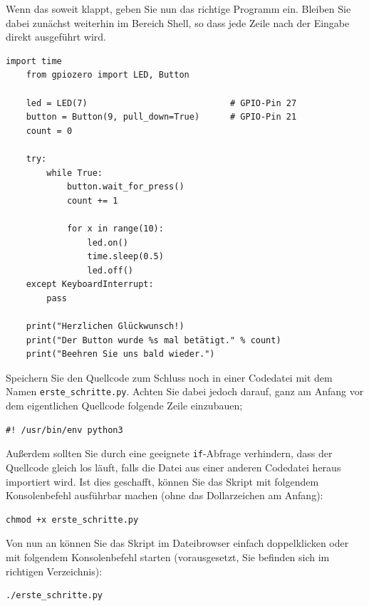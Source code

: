 \bigskip
\teilaufgabe
Wenn das soweit klappt, geben Sie nun das richtige Programm ein. Bleiben Sie
dabei zunächst weiterhin im Bereich \glqq{}Shell\grqq{}, so dass jede Zeile
nach der Eingabe direkt ausgeführt wird.

\begin{Verbatim}[gobble=4]
    import time
    from gpiozero import LED, Button

    led = LED(7)                            # GPIO-Pin 27
    button = Button(9, pull_down=True)      # GPIO-Pin 21
    count = 0

    try:
        while True:
            button.wait_for_press()
            count += 1

            for x in range(10):
                led.on()
                time.sleep(0.5)
                led.off()
    except KeyboardInterrupt:
        pass

    print("Herzlichen Glückwunsch!)
    print("Der Button wurde %s mal betätigt." % count)
    print("Beehren Sie uns bald wieder.")
\end{Verbatim}

\bigskip
\teilaufgabe
Speichern Sie den Quellcode zum Schluss noch in einer Codedatei mit dem Namen
\texttt{erste\_schritte.py}. Achten Sie dabei jedoch darauf, ganz am Anfang vor
dem eigentlichen Quellcode folgende Zeile einzubauen;

\begin{Verbatim}[gobble=4]
    #! /usr/bin/env python3
\end{Verbatim}

Außerdem sollten Sie durch eine geeignete \texttt{if}-Abfrage verhindern, dass
der Quellcode gleich los läuft, falls die Datei aus einer anderen Codedatei
heraus importiert wird. Ist dies geschafft, können Sie das Skript mit folgendem
Konsolenbefehl ausführbar machen (ohne das Dollarzeichen am Anfang):

\begin{Verbatim}[gobble=4]
    chmod +x erste_schritte.py
\end{Verbatim}

Von nun an können Sie das Skript im Dateibrowser einfach doppelklicken oder
mit folgendem Konsolenbefehl starten (vorausgesetzt, Sie befinden sich im
richtigen Verzeichnis):

\begin{Verbatim}[gobble=4]
    ./erste_schritte.py
\end{Verbatim}

\clearpage

